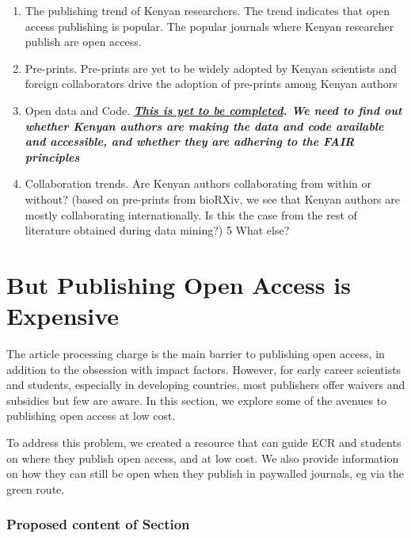 \begin{enumerate}
\def\labelenumi{\arabic{enumi}.}
\tightlist
\item
  The publishing trend of Kenyan researchers. The trend indicates that
  open access publishing is popular. The popular journals where Kenyan
  researcher publish are open access.
\item
  Pre-prints. Pre-prints are yet to be widely adopted by Kenyan
  scientists and foreign collaborators drive the adoption of pre-prints
  among Kenyan authors
\item
  Open data and Code.
  \textbf{\emph{\href{https://github.com/BioinfoNet/Data-mining/issues/11}{This
  is yet to be completed}. We need to find out whether Kenyan authors
  are making the data and code available and accessible, and whether
  they are adhering to the FAIR principles}}
\item
  Collaboration trends. Are Kenyan authors collaborating from within or
  without? (based on pre-prints from bioRXiv, we see that Kenyan authors
  are mostly collaborating internationally. Is this the case from the
  rest of literature obtained during data mining?) 5 What else?
\end{enumerate}

\section*{But Publishing Open Access is
Expensive}\label{but-publishing-open-access-is-expensive}

The article processing charge is the main barrier to publishing open
access, in addition to the obsession with impact factors. However, for
early career scientists and students, especially in developing
countries, most publishers offer waivers and subsidies but few are
aware. In this section, we explore some of the avenues to publishing
open access at low cost.

To address this problem, we created a resource that can guide ECR and
students on where they publish open access, and at low cost. We also
provide information on how they can still be open when they publish in
paywalled journals, eg via the green route.

\subsubsection{Proposed content of
Section}\label{proposed-content-of-section}

